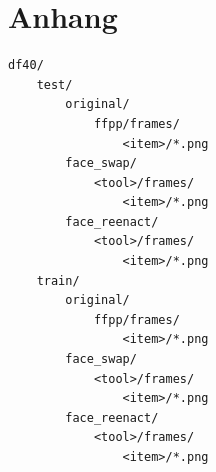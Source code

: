 \documentclass{article}
\begin{document}
\newpage



\section*{Anhang}
\begin{lstlisting}[label={apx:lst.df40},caption={Ordnerstruktur des DF40-Datensets im \texttt{io/}-Verzeichnis}]
df40/
    test/
        original/
            ffpp/frames/
                <item>/*.png
        face_swap/
            <tool>/frames/
                <item>/*.png
        face_reenact/
            <tool>/frames/
                <item>/*.png
    train/
        original/
            ffpp/frames/
                <item>/*.png
        face_swap/
            <tool>/frames/
                <item>/*.png
        face_reenact/
            <tool>/frames/
                <item>/*.png
\end{lstlisting}
\end{document}
